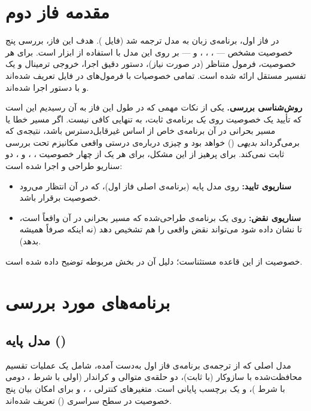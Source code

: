 \documentclass[12pt]{report}
\begin{document}
	\section{مقدمه فاز دوم}
	در فاز اول، برنامه‌ی زبان  به مدل  ترجمه شد (فایل ). هدف این فاز، بررسی پنج خصوصیت مشخص —
	،
	،
	،
	 و
	— بر روی این مدل با استفاده از ابزار  است. برای هر خصوصیت، فرمول  متناظر (در صورت نیاز)، دستور دقیق اجرا، خروجی ترمینال و یک تفسیر مستقل ارائه شده است.
	تمامی خصوصیات با فرمول‌های  در فایل  تعریف شده‌اند و با دستور  اجرا شده‌اند.
	
	\textbf{روش‌شناسی بررسی.} یکی از نکات مهمی که در طول این فاز به آن رسیدیم این است که تأیید یک خصوصیت روی \emph{یک} برنامه‌ی ثابت، به تنهایی کافی نیست. اگر مسیر خطا یا مسیر بحرانی در آن برنامه‌ی خاص از اساس غیرقابل‌دسترس باشد، نتیجه‌ی  که  برمی‌گرداند \emph{بدیهی} () خواهد بود و چیزی درباره‌ی درستی واقعی مکانیزم تحت بررسی ثابت نمی‌کند. برای پرهیز از این مشکل، برای هر یک از چهار خصوصیت ، ،  و ، دو سناریو طراحی و اجرا شده است:
	\begin{itemize}
		\item \textbf{سناریوی تایید:} روی مدل پایه (برنامه‌ی اصلی فاز اول)، که در آن انتظار می‌رود خصوصیت برقرار باشد.
		\item \textbf{سناریوی نقض:} روی یک برنامه‌ی طراحی‌شده که مسیر بحرانی در آن واقعاً  است، تا نشان داده شود  می‌تواند نقض واقعی را هم تشخیص دهد (نه اینکه صرفاً همیشه  بدهد).
	\end{itemize}
	خصوصیت  از این قاعده مستثناست؛ دلیل آن در بخش مربوطه توضیح داده شده است.
	
	\section{برنامه‌های مورد بررسی}
	
	\subsection{مدل پایه ()}
	مدل  اصلی که از ترجمه‌ی برنامه‌ی فاز اول به‌دست آمده، شامل یک عملیات تقسیم محافظت‌شده با سازوکار  (با  ثابت)، دو حلقه‌ی متوالی و کراندار (اولی با شرط ، دومی با شرط )، و یک برچسب پایانی  است. متغیرهای کنترلی ، ،  و  برای امکان بیان پنج خصوصیت در سطح سراسری () تعریف شده‌اند.
	
\end{document}
